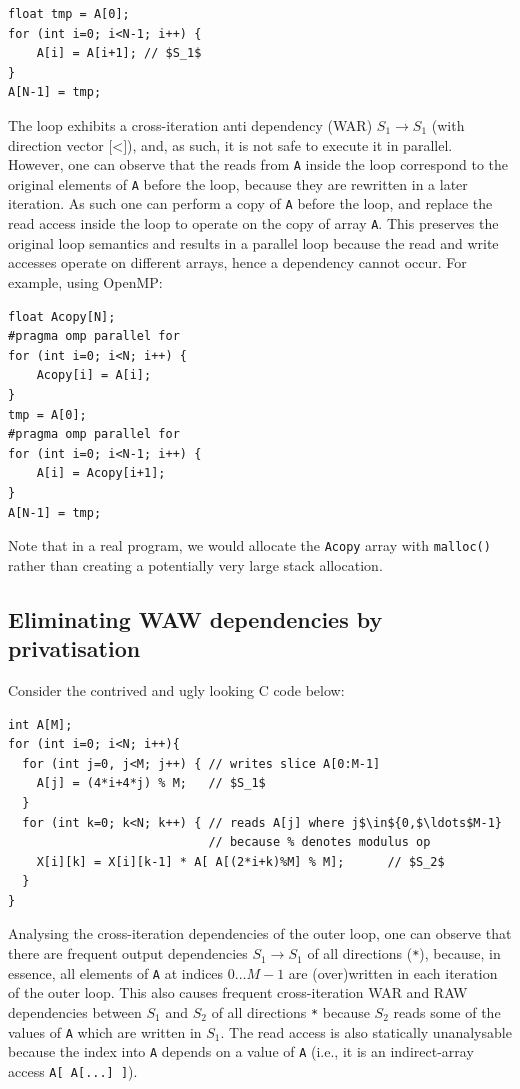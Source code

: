 \begin{lstlisting}[mathescape=true]
float tmp = A[0];
for (int i=0; i<N-1; i++) {
    A[i] = A[i+1]; // $S_1$
}
A[N-1] = tmp;
\end{lstlisting}

The loop exhibits a cross-iteration anti dependency (WAR) $S_1\to S_1$
(with direction vector $\texttt{[<]}$), and, as such, it is not safe
to execute it in parallel. However, one can observe that the reads
from \texttt{A} inside the loop correspond to the original elements of
\texttt{A} before the loop, because they are rewritten in a later
iteration.  As such one can perform a copy of \texttt{A} before the
loop, and replace the read access inside the loop to operate on the
copy of array \texttt{A}. This preserves the original loop semantics
and results in a parallel loop because the read and write accesses
operate on different arrays, hence a dependency cannot occur. For
example, using OpenMP:

\begin{lstlisting}[mathescape=true]
float Acopy[N];
#pragma omp parallel for
for (int i=0; i<N; i++) {
    Acopy[i] = A[i];
}
tmp = A[0];
#pragma omp parallel for
for (int i=0; i<N-1; i++) {
    A[i] = Acopy[i+1];
}
A[N-1] = tmp;
\end{lstlisting}

Note that in a real program, we would allocate the \texttt{Acopy}
array with \texttt{malloc()} rather than creating a potentially very
large stack allocation.

\subsection{Eliminating WAW dependencies by privatisation}

Consider the contrived and ugly looking C code below:

\begin{lstlisting}[mathescape=true]
int A[M];
for (int i=0; i<N; i++){
  for (int j=0, j<M; j++) { // writes slice A[0:M-1]
    A[j] = (4*i+4*j) % M;   // $S_1$
  }
  for (int k=0; k<N; k++) { // reads A[j] where j$\in${0,$\ldots$M-1}
                            // because % denotes modulus op
    X[i][k] = X[i][k-1] * A[ A[(2*i+k)%M] % M];      // $S_2$
  }
}
\end{lstlisting}

Analysing the cross-iteration dependencies of the outer loop,
one can observe that there are frequent output dependencies
$S_1\to S_1$ of all directions (\texttt{*}), because, in
essence, all elements of \texttt{A} at indices $0\ldots M-1$
are (over)written in each iteration of the outer loop.
This also causes frequent cross-iteration WAR and RAW
dependencies between $S_1$ and $S_2$ of all directions
\texttt{*} because $S_2$ reads some of the values of
\texttt{A} which are written in $S_1$. The read access
is also statically unanalysable because the index
into \texttt{A} depends on a value of \texttt{A} (i.e.,
it is an indirect-array access \texttt{A[ A[...] ]}).

